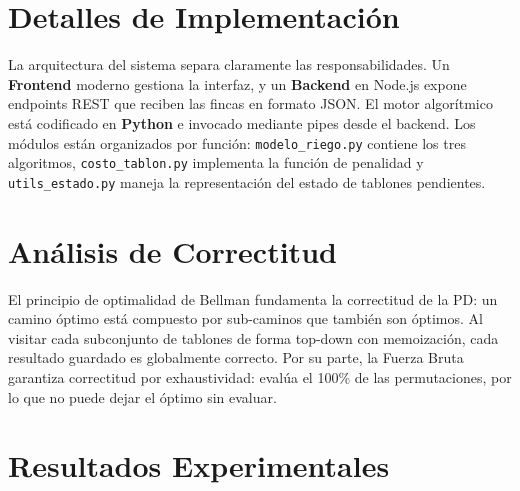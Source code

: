 \documentclass[conference, a4paper]{IEEEtran}
\begin{document}
\section{Detalles de Implementación}
La arquitectura del sistema separa claramente las responsabilidades. Un \textbf{Frontend} moderno gestiona la interfaz, y un \textbf{Backend} en Node.js expone endpoints REST que reciben las fincas en formato JSON. El motor algorítmico está codificado en \textbf{Python} e invocado mediante pipes desde el backend. Los módulos están organizados por función: \texttt{modelo\_riego.py} contiene los tres algoritmos, \texttt{costo\_tablon.py} implementa la función de penalidad y \texttt{utils\_estado.py} maneja la representación del estado de tablones pendientes.

\section{Análisis de Correctitud}
El principio de optimalidad de Bellman \cite{bellman1966dynamic} fundamenta la correctitud de la PD: un camino óptimo está compuesto por sub-caminos que también son óptimos. Al visitar cada subconjunto de tablones de forma top-down con memoización, cada resultado guardado es globalmente correcto. Por su parte, la Fuerza Bruta garantiza correctitud por exhaustividad: evalúa el 100\% de las permutaciones, por lo que no puede dejar el óptimo sin evaluar.

\section{Resultados Experimentales}
\begin{table}[htbp]
\centering
\caption{Costos y Rendimiento (Muestra Aleatoria de Pruebas)}
\end{table}
\end{document}

